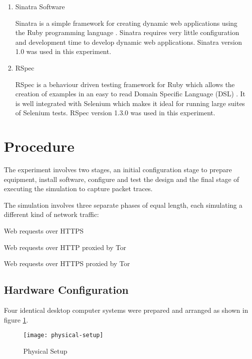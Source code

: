 \begin{enumerate}
  \item Sinatra Software

  Sinatra is a simple framework for creating dynamic web applications using the
  Ruby programming language \parencite{:2010bh}. Sinatra requires very little
  configuration and development time to develop dynamic web applications.
  Sinatra version 1.0 was used in this experiment.

  \item RSpec

  RSpec is a behaviour driven testing framework for Ruby which allows the
  creation of examples in an easy to read Domain Specific Language (DSL)
  \parencite{Chelimsky:2010vn}. It is well integrated with Selenium which makes
  it ideal for running large suites of Selenium tests. RSpec version 1.3.0 was
  used in this experiment.

\end{enumerate}

\section{Procedure}

The experiment involves two stages, an initial configuration stage to prepare
equipment, install software, configure and test the design and the final stage
of executing the simulation to capture packet traces.

The simulation involves three separate phases of equal length, each simulating a
different kind of network traffic:

\begin{enumerate*}
  \item Web requests over HTTPS
  \item Web requests over HTTP proxied by Tor
  \item Web requests over HTTPS proxied by Tor
\end{enumerate*}

\subsection{Hardware Configuration}

Four identical desktop computer systems were prepared and arranged as shown
in figure \ref{fig:physical-setup}.

\begin{figure}[H]
  \centering\texttt{[image: physical-setup]}
  \caption{Physical Setup}
  \label{fig:physical-setup}
\end{figure}

